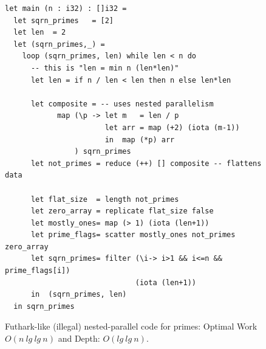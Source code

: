 \documentclass[acmsmall,review]{acmart}\settopmatter{printfolios=true,printccs=false,printacmref=false}
\begin{document}
\begin{figure}
\begin{lstlisting}[mathescape=true]
let main (n : i32) : []i32 =
  let sqrn_primes   = [2]
  let len  = 2
  let (sqrn_primes,_) =
    loop (sqrn_primes, len) while len < n do
      -- this is "len = min n (len*len)"
      let len = if n / len < len then n else len*len

      let composite = -- uses nested parallelism
            map (\p -> let m   = len / p
                       let arr = map (+2) (iota (m-1))
                       in  map (*p) arr
                ) sqrn_primes
      let not_primes = reduce (++) [] composite -- flattens data

      let flat_size  = length not_primes
      let zero_array = replicate flat_size false
      let mostly_ones= map (> 1) (iota (len+1))
      let prime_flags= scatter mostly_ones not_primes zero_array
      let sqrn_primes= filter (\i-> i>1 && i<=n && prime_flags[i])
                              (iota (len+1))
      in  (sqrn_primes, len)
  in sqrn_primes
\end{lstlisting}\vspace{-4ex}
\caption{Futhark-like (illegal) nested-parallel code for primes:
            Optimal Work $O(n~lg~lg~n)$ and Depth: $O(lg~lg~n)$.}
\label{fig:primes-nested-par-Futhark}
\end{figure}
\end{document}
